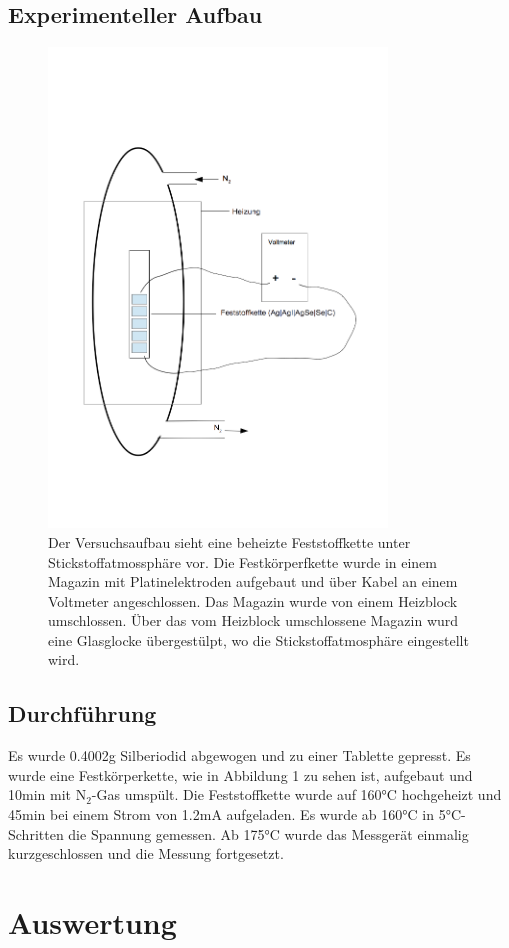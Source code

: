 \documentclass[12pt,a4paper,titlepage,headinclude,bibtotoc]{scrartcl}
\begin{document}
\subsection{Experimenteller Aufbau}
\begin{figure}[h]
\centering
\includegraphics[width=9cm]{VB.png}
\caption{Der Versuchsaufbau sieht eine beheizte Feststoffkette unter Stickstoffatmossphäre vor. Die Festkörperfkette wurde in einem Magazin mit Platinelektroden aufgebaut und über Kabel an einem Voltmeter angeschlossen. Das Magazin wurde von einem Heizblock umschlossen.  Über das vom Heizblock umschlossene Magazin wurd eine Glasglocke übergestülpt, wo die Stickstoffatmosphäre eingestellt wird.}
\end{figure} 
\FloatBarrier
\subsection{Durchführung}
Es wurde 0.4002\;g Silberiodid abgewogen und zu einer Tablette gepresst. Es wurde eine Festkörperkette, wie in Abbildung 1 zu sehen ist, aufgebaut und 10\;min mit $\text{N}_2$-Gas umspült. Die Feststoffkette wurde auf 160\;°C hochgeheizt und 45\;min bei einem Strom von 1.2\;mA aufgeladen. Es wurde ab 160\;°C in 5\;°C-Schritten die Spannung gemessen. Ab 175\;°C wurde das Messgerät einmalig kurzgeschlossen und die Messung fortgesetzt. 
\section{Auswertung}
\end{document}
